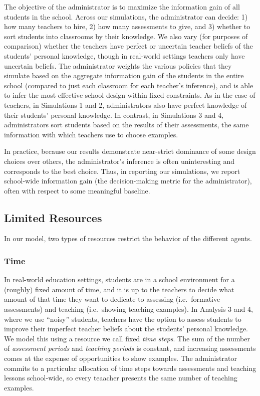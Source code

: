 \documentclass[10pt, letterpaper]{article}
\begin{document}
The objective of the administrator is to maximize the information gain
of all students in the school. Across our simulations, the administrator
can decide: 1) how many teachers to hire, 2) how many assessments to
give, and 3) whether to sort students into classrooms by their
knowledge. We also vary (for purposes of comparison) whether the
teachers have perfect or uncertain teacher beliefs of the students'
personal knowledge, though in real-world settings teachers only have
uncertain beliefs. The administrator weights the various policies that
they simulate based on the aggregate information gain of the students in
the entire school (compared to just each classroom for each teacher's
inference), and is able to infer the most effective school design within
fixed constraints. As in the case of teachers, in Simulations 1 and 2,
administrators also have perfect knowledge of their students' personal
knowledge. In contrast, in Simulations 3 and 4, administrators sort
students based on the results of their assessments, the same information
with which teachers use to choose examples.

In practice, because our results demonstrate near-strict dominance of
some design choices over others, the administrator's inference is often
uninteresting and corresponds to the best choice. Thus, in reporting our
simulations, we report school-wide information gain (the decision-making
metric for the administrator), often with respect to some meaningful
baseline.

\subsection{Limited Resources}\label{limited-resources}

In our model, two types of resources restrict the behavior of the
different agents.

\subsubsection{Time}\label{time}

In real-world education settings, students are in a school environment
for a (roughly) fixed amount of time, and it is up to the teachers to
decide what amount of that time they want to dedicate to assessing
(i.e.~formative assessments) and teaching (i.e.~showing teaching
examples). In Analysis 3 and 4, where we use ``noisy'' students,
teachers have the option to assess students to improve their imperfect
teacher beliefs about the students' personal knowledge. We model this
using a resource we call fixed \emph{time steps}. The sum of the number
of \emph{assessment periods} and \emph{teaching periods} is constant,
and increasing assessments comes at the expense of opportunities to show
examples. The administrator commits to a particular allocation of time
steps towards assessments and teaching lessons school-wide, so every
teaacher presents the same number of teaching examples.
\end{document}
